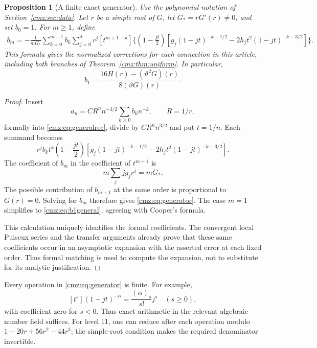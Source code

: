 \documentclass[11pt,letterpaper]{article}
\numberwithin{equation}{section}
\newtheorem{proposition}[theorem]{Proposition}
\theoremstyle{definition}\newtheorem{definition}[theorem]{Definition}
\theoremstyle{remark}\newtheorem{remark}[theorem]{Remark}
\newcommand{\tht}{\vartheta}
\begin{document}
\begin{proposition}[A finite exact generator]
\label{cmz:prop:generator}
Use the polynomial notation of Section~\ref{cmz:sec:data}. Let $r$ be a simple root of $G$, let $G_*=rG'(r)\ne0$, and set $b_0=1$. For $m\geq1$, define
\begin{align}
b_m=-\frac1{mG_*}\sum_{k=0}^{m-1}b_k\sum_{j=0}^d r^j
[t^{m+1-k}]\Bigg\{
\left(1-\frac{jt}{2}\right)
\left[g_j(1-jt)^{-k-1/2}
       -2h_jt^2(1-jt)^{-k-3/2}\right]\Bigg\}.
\label{cmz:eq:generator}
\end{align}
This formula gives the normalized corrections for each connection in this article, including both branches of Theorem~\ref{cmz:thm:uniform}. In particular,
\begin{equation}
b_1=\frac{16H(r)-(\tht^2G)(r)}{8(\tht G)(r)}.
\label{cmz:eq:b1general}
\end{equation}
\end{proposition}
\begin{proof}
Insert
\[
a_n=C R^n n^{-3/2}\sum_{k\geq0}b_kn^{-k},\qquad R=1/r,
\]
formally into \eqref{cmz:eq:generalrec}, divide by $CR^n n^{3/2}$ and put $t=1/n$. Each summand becomes
\[
r^j b_k t^k\left(1-\frac{jt}{2}\right)
\left[g_j(1-jt)^{-k-1/2}
       -2h_jt^2(1-jt)^{-k-3/2}\right].
\]
The coefficient of $b_m$ in the coefficient of $t^{m+1}$ is
\[
m\sum_j jg_jr^j=mG_*.
\]
The possible contribution of $b_{m+1}$ at the same order is proportional to $G(r)=0$. Solving for $b_m$ therefore gives \eqref{cmz:eq:generator}. The case $m=1$ simplifies to \eqref{cmz:eq:b1general}, agreeing with Cooper's formula.

This calculation uniquely identifies the formal coefficients. The convergent local Puiseux series and the transfer arguments already prove that these same coefficients occur in an asymptotic expansion with the asserted error at each fixed order. Thus formal matching is used to compute the expansion, not to substitute for its analytic justification.
\end{proof}

Every operation in \eqref{cmz:eq:generator} is finite. For example,
\[
[t^s](1-jt)^{-\alpha}=\frac{(\alpha)_s}{s!}j^s
\quad(s\geq0),
\]
with coefficient zero for $s<0$. Thus exact arithmetic in the relevant algebraic number field suffices. For level 11, one can reduce after each operation modulo $1-20r+56r^2-44r^3$; the simple-root condition makes the required denominator invertible.
\end{document}
